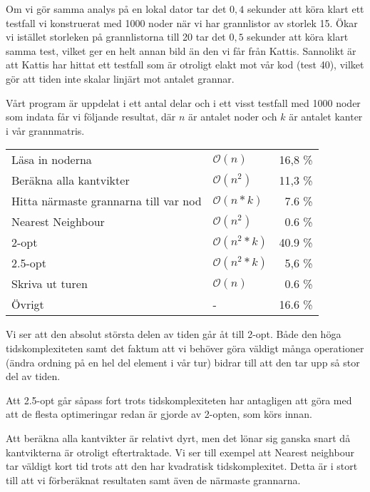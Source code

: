 \documentclass[a4paper,12pt]{article}
\renewcommand{\O}{\ensuremath{\mathcal{O}}}
\renewcommand{\*}{\ensuremath{\cdot}}
\begin{document}
Om vi gör samma analys på en lokal dator tar det $0,4$ sekunder att köra klart
ett testfall vi konstruerat med 1000 noder när vi har grannlistor av storlek 15.
Ökar vi istället storleken på grannlistorna till 20 tar det $0,5$ sekunder att
köra klart samma test, vilket ger en helt annan bild än den vi får från Kattis.
Sannolikt är att Kattis har hittat ett testfall som är otroligt elakt mot vår
kod (test 40), vilket gör att tiden inte skalar linjärt mot antalet grannar.

Vårt program är uppdelat i ett antal delar och i ett visst testfall med 1000
noder som indata får vi följande resultat, där $n$ är antalet noder och $k$ är
antalet kanter i vår grannmatris.

\begin{tabular}{| l | l | r |}
    \hline
    Läsa in noderna                          & $\O(n)$      & 16,8 \%  \\
    Beräkna alla kantvikter	                 & $\O(n^2)$    & 11,3 \%  \\    
    Hitta närmaste grannarna till var nod    & $\O(n*k)$    & 7.6 \%   \\    
    Nearest Neighbour                        & $\O(n^2)$    & 0.6 \%   \\    
    2-opt	                                 & $\O(n^2*k)$  & 40.9 \%  \\        
    2.5-opt	                                 & $\O(n^2*k)$  & 5,6 \%   \\        
    Skriva ut turen	                         & $\O(n)$      & 0.6 \%   \\    
    Övrigt	                                 & -            & 16.6 \%  \\
    \hline
\end{tabular}


Vi ser att den absolut största delen av tiden går åt till 2-opt. Både den höga
tidskomplexiteten samt det faktum att vi behöver göra väldigt många operationer
(ändra ordning på en hel del element i vår tur) bidrar till att den tar upp så
stor del av tiden.

Att 2.5-opt går såpass fort trots tidskomplexiteten har antagligen att göra med
att de flesta optimeringar redan är gjorde av 2-opten, som körs innan.

Att beräkna alla kantvikter är relativt dyrt, men det lönar sig ganska snart då
kantvikterna är otroligt eftertraktade. Vi ser till exempel att Nearest
neighbour tar väldigt kort tid trots att den har kvadratisk tidskomplexitet. 
Detta är i stort till att vi förberäknat resultaten samt även de närmaste
grannarna. %
\end{document}
